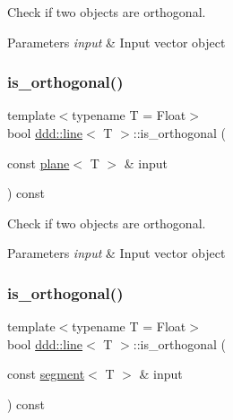 Check if two objects are orthogonal. 


\begin{DoxyParams}{Parameters}
{\em input} & Input vector object \\
\hline
\end{DoxyParams}
\mbox{\label{classddd_1_1line_a52b6c5a1d0ca010c109d98e43ea43427}} 
\subsubsection{\texorpdfstring{is\+\_\+orthogonal()}{is\_orthogonal()}\hspace{0.1cm}{\footnotesize\ttfamily [4/5]}}
{\footnotesize\ttfamily template$<$typename T = Float$>$ \\
bool \hyperlink{classddd_1_1line}{ddd\+::line}$<$ T $>$\+::is\+\_\+orthogonal (\begin{DoxyParamCaption}\item[{const \hyperlink{classddd_1_1plane}{plane}$<$ T $>$ \&}]{input }\end{DoxyParamCaption}) const\hspace{0.3cm}{\ttfamily [inline]}}



Check if two objects are orthogonal. 


\begin{DoxyParams}{Parameters}
{\em input} & Input vector object \\
\hline
\end{DoxyParams}
\mbox{\label{classddd_1_1line_a2ddfad009ef1e253b854bfecaa7f759c}} 
\subsubsection{\texorpdfstring{is\+\_\+orthogonal()}{is\_orthogonal()}\hspace{0.1cm}{\footnotesize\ttfamily [5/5]}}
{\footnotesize\ttfamily template$<$typename T = Float$>$ \\
bool \hyperlink{classddd_1_1line}{ddd\+::line}$<$ T $>$\+::is\+\_\+orthogonal (\begin{DoxyParamCaption}\item[{const \hyperlink{classddd_1_1segment}{segment}$<$ T $>$ \&}]{input }\end{DoxyParamCaption}) const\hspace{0.3cm}{\ttfamily [inline]}}



